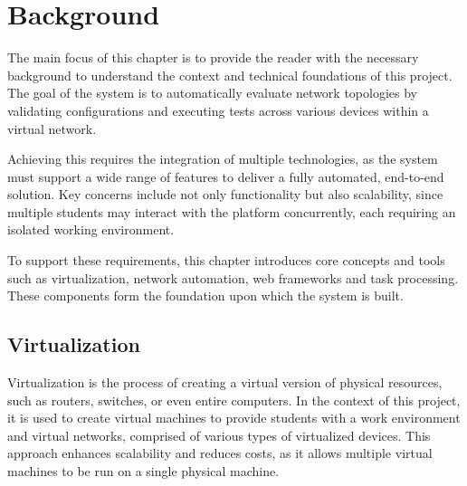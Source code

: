 
\chapter{Background}


\label{ChapterBackground}


The main focus of this chapter is to provide the reader with the necessary background to understand the context and technical 
foundations of this project. The goal of the system is to automatically evaluate network topologies by validating 
configurations and executing tests across various devices within a virtual network.

Achieving this requires the integration of multiple technologies, as the system must support a wide range of features to 
deliver a fully automated, end-to-end solution. Key concerns include not only functionality but also scalability, since 
multiple students may interact with the platform concurrently, each requiring an isolated working environment.

To support these requirements, this chapter introduces core concepts and tools such as virtualization, network automation, 
web frameworks and task processing. These components form the foundation upon which the system is built.


\section{Virtualization}
Virtualization is the process of creating a virtual version of physical resources, such as routers, switches, or even
entire computers. In the context of this project, it is used to create virtual machines to provide students with a 
work environment and virtual networks, comprised of various types of virtualized devices. This approach enhances scalability 
and reduces costs, as it allows multiple virtual machines to be run on a single physical machine.

